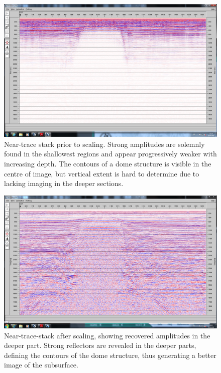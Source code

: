 \documentclass[10pt,a4paper]{article}
\begin{document}
\begin{figure}[H]
\includegraphics[width=\textwidth, trim={1.5cm 1.5cm 1cm 1.5cm},clip]{fig3.jpg}
\caption{Near-trace stack prior to scaling. Strong amplitudes are solemnly found in the shallowest regions and appear progressively weaker with increasing depth. The contours of a dome structure is visible in the centre of image, but vertical extent is hard to determine due to lacking imaging in the deeper sections.}
\label{fig3}
\end{figure}

\begin{figure}[H]
\includegraphics[width=\textwidth, trim={1.5cm 1.5cm 1cm 1.5cm},clip]{fig4.jpg}
\caption{Near-trace-stack after scaling, showing recovered amplitudes in the deeper part. Strong reflectors are revealed in the deeper parts, defining the contours of the dome structure, thus generating a better image of the subsurface.}
\label{fig4}
\end{figure}
\end{document}
